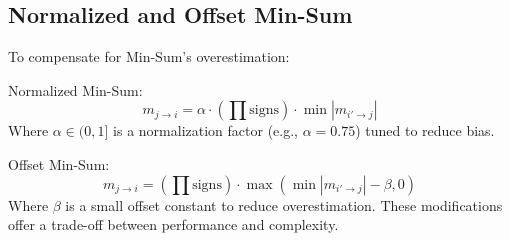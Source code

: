 \subsection{Normalized and Offset Min-Sum}
To compensate for Min-Sum's overestimation:

Normalized Min-Sum:
$$
m_{j \to i} = \alpha \cdot \left( \prod \text{signs} \right) \cdot \min \left| m_{i' \to j} \right|
$$
Where $\alpha \in (0,1]$ is a normalization factor (e.g., $\alpha = 0.75$) tuned to reduce bias.

Offset Min-Sum:
$$
m_{j \to i} = \left( \prod \text{signs} \right) \cdot \max \left( \min \left| m_{i' \to j} \right| - \beta, 0 \right)
$$
Where $\beta$ is a small offset constant to reduce overestimation.
These modifications offer a trade-off between performance and complexity.